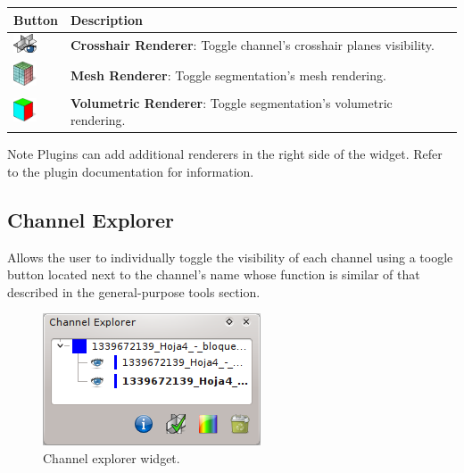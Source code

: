 \begin{tabular}{| m{1.3cm} | m{13.5cm} |}
\hline
\textbf{Button} & \textbf{Description}\\
\hline
\includegraphics[width=0.7cm]{../../frontend/rsc/show_planes} &
\textbf{Crosshair Renderer}: Toggle channel's crosshair planes visibility.\\
\hline
\includegraphics[width=0.7cm]{../../frontend/rsc/mesh} &
\textbf{Mesh Renderer}: Toggle segmentation's mesh rendering.\\
\hline
\includegraphics[width=0.7cm]{../../frontend/rsc/voxel} &
\textbf{Volumetric Renderer}: Toggle segmentation's volumetric rendering.\\
\hline
\end{tabular}
\vspace{0.3cm}

\begin{bclogo}[couleur = yellow!33, logo=\bcattention]
{Note} Plugins can add additional renderers in the right side of the widget. Refer to
the plugin documentation for information.
\end{bclogo}

\subsection{Channel Explorer}
Allows the user to individually toggle the visibility of each channel using a toogle button
located next to the channel's name whose function is similar of that described in the
general-purpose tools section.

\begin{figure}[H]
\centering
\includegraphics{fig/ChannelExplorer}
\caption{Channel explorer widget.}
\end{figure}

